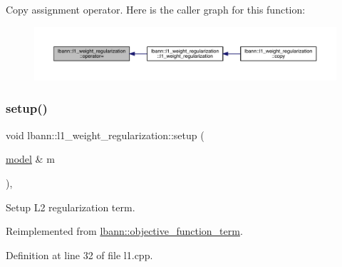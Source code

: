 Copy assignment operator. Here is the caller graph for this function\+:\nopagebreak
\begin{figure}[H]
\begin{center}
\leavevmode
\includegraphics[width=350pt]{classlbann_1_1l1__weight__regularization_ae6f3b7de9357ffd852372bb7e25a0c6a_icgraph}
\end{center}
\end{figure}
\mbox{\label{classlbann_1_1l1__weight__regularization_afcd238514ad132d66609efbb30de25ec}} 
\subsubsection{\texorpdfstring{setup()}{setup()}}
{\footnotesize\ttfamily void lbann\+::l1\+\_\+weight\+\_\+regularization\+::setup (\begin{DoxyParamCaption}\item[{\hyperlink{classlbann_1_1model}{model} \&}]{m }\end{DoxyParamCaption})\hspace{0.3cm}{\ttfamily [override]}, {\ttfamily [virtual]}}

Setup L2 regularization term. 

Reimplemented from \hyperlink{classlbann_1_1objective__function__term_a6c8dbdf18aac8676098189fb7b178e91}{lbann\+::objective\+\_\+function\+\_\+term}.



Definition at line 32 of file l1.\+cpp.


